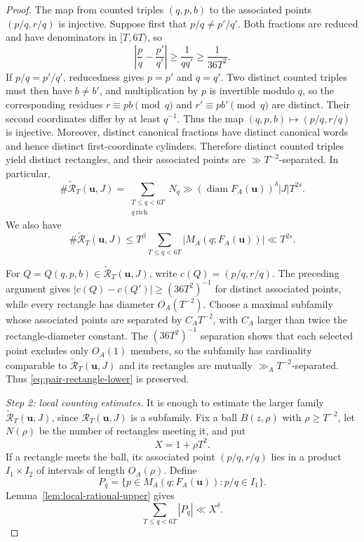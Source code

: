 \documentclass[11pt]{amsart}
\newcommand{\diam}{\operatorname{diam}}
\begin{document}
\begin{proof}
The map from counted triples $(q,p,b)$ to the associated points $(p/q,r/q)$ is injective.
Suppose first that $p/q\ne p'/q'$.  Both fractions are reduced and have
denominators in $[T,6T)$, so
$$
 \left|\frac pq-\frac{p'}{q'}\right|\ge\frac1{qq'}\ge\frac1{36T^2}.
$$
If $p/q=p'/q'$, reducedness gives $p=p'$ and $q=q'$.  Two distinct counted
triples must then have $b\ne b'$, and multiplication by $p$ is invertible modulo
$q$, so the corresponding residues $r\equiv pb\pmod q$ and
$r'\equiv pb'\pmod q$ are distinct.  Their second coordinates differ by
at least $q^{-1}$.  Thus the map $(q,p,b)\mapsto(p/q,r/q)$ is injective.  Moreover, distinct
canonical fractions have distinct canonical words and hence distinct
first-coordinate cylinders.  Therefore distinct counted triples yield distinct
rectangles, and their associated points are $\gg T^{-2}$-separated.
In particular,
$$
 \#\widetilde{\mathcal R}_T(\mathbf{u},J)
 =\sum_{\substack{T\le q<6T\\q\ \mathrm{rich}}}N_q
 \gg (\diam F_A(\mathbf{u}))^\delta |J|T^{2s}.
$$
We also have
\begin{equation}\label{eq:pair-total-upper}
 \#\widetilde{\mathcal R}_T(\mathbf{u},J)
 \le T^\beta\sum_{T\le q<6T}|M_A(q;F_A(\mathbf{u}))|
 \ll T^{2s}.
\end{equation}

For $Q=Q(q,p,b)\in\widetilde{\mathcal R}_T(\mathbf{u},J)$, write
$c(Q)=(p/q,r/q)$.  The preceding argument gives
$|c(Q)-c(Q')|\ge (36T^2)^{-1}$ for distinct associated points, while every
rectangle has diameter $O_A(T^{-2})$.  Choose a maximal subfamily whose
associated points are separated by $C_AT^{-2}$, with $C_A$ larger than twice
the rectangle-diameter constant.  The $(36T^2)^{-1}$ separation shows that
each selected point excludes only $O_A(1)$ members, so the subfamily has
cardinality comparable to $\widetilde{\mathcal R}_T(\mathbf{u},J)$ and its
rectangles are mutually $\gg_A T^{-2}$-separated.  Thus
\eqref{eq:pair-rectangle-lower} is preserved.

\medskip
\noindent\emph{Step 2: local counting estimates.}
It is enough to estimate the larger family
$\widetilde{\mathcal R}_T(\mathbf{u},J)$, since $\mathcal R_T(\mathbf{u},J)$ is a subfamily.
Fix a ball
$B(z,\rho)$ with $\rho\ge T^{-2}$, let $N(\rho)$ be the number of rectangles
meeting it, and put
$$
 X=1+\rho T^2.
$$
If a rectangle meets the ball, its associated point $(p/q,r/q)$ lies in a product $I_1\times I_2$
of intervals of length $O_A(\rho)$.  Define
$$
 P_q=\{p\in M_A(q;F_A(\mathbf{u})):p/q\in I_1\}.
$$
Lemma~\ref{lem:local-rational-upper} gives
\begin{equation}\label{eq:local-p-mass}
 \sum_{T\le q<6T}|P_q|\ll X^\delta.
\end{equation}


\end{proof}
\end{document}
